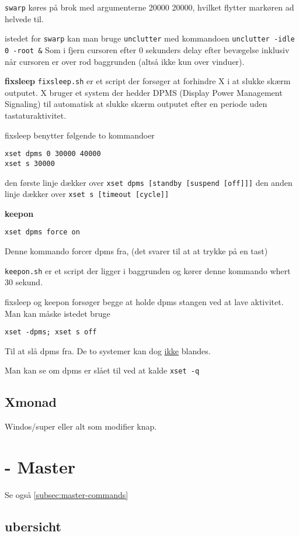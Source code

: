 \documentclass[10pt,a4paper,danish]{article}
\newcommand{\code}[1]{\colorbox{verbgray}{\texttt{#1}}}
\begin{document}
\texttt{swarp} køres på brok med argumenterne 20000 20000, hvilket flytter
markøren ad helvede til.

istedet for \texttt{swarp} kan man bruge \texttt{unclutter}
med kommandoen \code{unclutter -idle 0 -root \&}
Som i fjern cursoren efter 0 sekunders delay efter bevægelse inklusiv når
cursoren er over rod baggrunden (altså ikke kun over vinduer).

\textbf{fixsleep}
\texttt{fixsleep.sh} er et script der forsøger at forhindre X i at slukke skærm outputet.
X bruger et system der hedder DPMS (Display Power Management Signaling) til
automatisk at slukke skærm outputet efter en periode uden tastaturaktivitet.

fixsleep benytter følgende to kommandoer
\begin{verbatim}
xset dpms 0 30000 40000
xset s 30000
\end{verbatim}
den første linje dækker over \texttt{xset dpms [standby [suspend [off]]]}
den anden linje dækker over \texttt{xset s [timeout [cycle]]}

\textbf{keepon}
\begin{verbatim}
xset dpms force on
\end{verbatim}
Denne kommando forcer dpms fra, (det svarer til at at trykke på en tast)

\texttt{keepon.sh} er et script der ligger i baggrunden og kører denne kommando
whert 30 sekund.


fixsleep og keepon forsøger begge at holde dpms stangen ved at lave aktivitet.
Man kan måske istedet bruge
\begin{verbatim}
xset -dpms; xset s off
\end{verbatim}
Til at slå dpms fra.
De to systemer kan dog \uline{ikke} blandes.

Man kan se om dpms er slået til ved at kalde \code{xset -q}
\subsection{Xmonad}
Windos/super eller alt som modifier knap.

\newpage
\section{- Master}
Se også \ref{subsec:master-commands}

\subsection{ubersicht}
\label{subsec:ubersicht}
\end{document}
